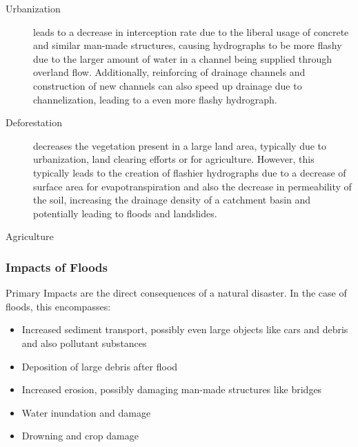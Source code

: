 \documentclass[../../main]{subfiles}
\begin{document}
	\begin{description}
		\item[Urbanization] leads to a decrease in interception rate due to the liberal usage of concrete and similar man-made structures, causing hydrographs to be more flashy due to the larger amount of water in a channel being supplied through overland flow. Additionally, reinforcing of drainage channels and construction of new channels can also speed up drainage due to channelization, leading to a even more flashy hydrograph.

		\item[Deforestation] decreases the vegetation present in a large land area, typically due to urbanization, land clearing efforts or for agriculture. However, this typically leads to the creation of flashier hydrographs due to a decrease of surface area for evapotranspiration and also the decrease in permeability of the soil, increasing the drainage density of a catchment basin and potentially leading to floods and landslides.

		\item[Agriculture]


	\end{description}

\subsubsection{Impacts of Floods}

	Primary Impacts are the direct consequences of a natural disaster. In the case of floods, this encompasses:

	\begin{itemize}
		\item Increased sediment transport, possibly even large objects like cars and debris and also pollutant substances
		\item Deposition of large debris after flood
		\item Increased erosion, possibly damaging man-made structures like bridges
		\item Water inundation and damage
		\item Drowning and crop damage
	\end{itemize}
\end{document}
